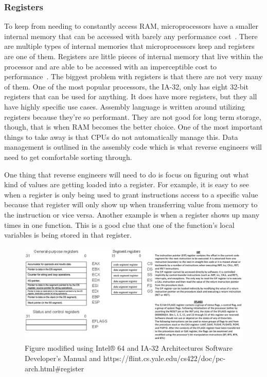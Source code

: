 \subsubsection{Registers}
To keep from needing to constantly access RAM, microprocessors have a smaller internal memory that can be accessed with barely any performance cost~\cite{Reversing}. 
There are multiple types of internal memories that microprocessors keep and registers are one of them.
Registers are little pieces of internal memory that live within the processor and are able to be accessed with an imperceptible cost to performance~\cite{PracticalRE}.
The biggest problem with registers is that there are not very many of them. 
One of the most popular processors, the IA-32, only has eight 32-bit registers that can be used for anything. 
It does have more registers, but they all have highly specific use cases. 
Assembly language is written around utilizing registers because they’re so performant. 
They are not good for long term storage, though, that is when RAM becomes the better choice. 
One of the most important things to take away is that CPUs do not automatically manage this. 
Data management is outlined in the assembly code which is what reverse engineers will need to get comfortable sorting through.

One thing that reverse engineers will need to do is focus on figuring out what kind of values are getting loaded into a register. 
For example, it is easy to see when a register is only being used to grant instructions access to a specific value because that register will only show up when transferring value from memory to the instruction or vice versa.
Another example is when a register shows up many times in one function. 
This is a good clue that one of the function's local variables is being stored in that register.
\begin{figure}[h]
	\caption{Figure modified using Intel® 64 and IA-32 Architectures Software Developer’s Manual and https://flint.cs.yale.edu/cs422/doc/pc-arch.html\#register}
	\includegraphics[scale=.27]{Register Diagram.jpeg}
\end{figure}

